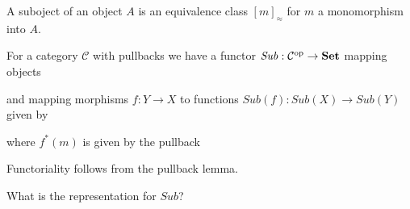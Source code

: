 \begin{definition}[Suboject]
	A suboject of an object $A$ is an equivalence class $[m]_{\approx}$ for $m$ a monomorphism into $A$.
\end{definition}

\begin{definition}
	For a category $\mathcal{C}$ with pullbacks we have a functor $\mathit{Sub}: \mathcal{C}^{\mathrm{op}} \to  \mathbf {Set}$ mapping objects
	
\begin{center}
\end{center}
and mapping morphisms $f: Y \to X$ to functions $\mathit{Sub}(f): \mathit{Sub}(X) \to \mathit{Sub}(Y)$ given by
\begin{center}
\end{center}
where $f^*(m)$ is given by the pullback
\begin{center}
\end{center}
\end{definition}
\begin{remark}
Functoriality follows from the pullback lemma.	
\end{remark}

\begin{exercise}
What is the representation for $\mathit{Sub}$?
\begin{center}
\end{center}	
\end{exercise}
 
